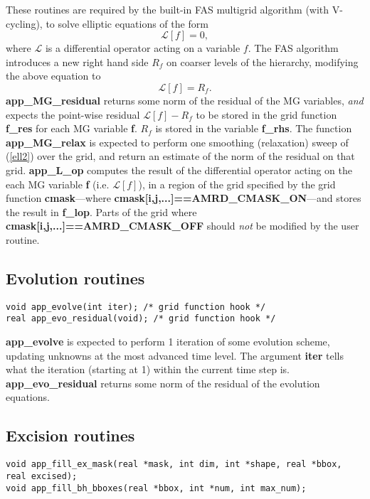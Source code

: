 \documentclass[aps,amssymb,unsortedaddress,nofootinbib]{revtex4}
\begin{document}
These routines are required by the built-in FAS multigrid algorithm (with V-cycling),
to solve elliptic equations of the form 
\begin{equation}
\mathcal{L} [f] = 0,
\end{equation}
where $\mathcal{L}$ is a differential operator acting on a variable $f$. The
FAS algorithm introduces a new right hand side $R_f$ on coarser levels
of the hierarchy, modifying the above equation to
\begin{equation}\label{ell2}
\mathcal{L} [f] = R_f.
\end{equation}
{\bf app\_MG\_residual} returns some norm of the residual of the MG variables,
{\em and} expects the point-wise residual $\mathcal{L} [f]-R_f$ to be stored in the grid function
{\bf f\_res} for each MG variable {\bf f}. $R_f$ is stored in the variable {\bf f\_rhs}. The function
{\bf app\_MG\_relax} is expected to perform one smoothing
(relaxation) sweep of (\ref{ell2}) over the grid, and return an estimate of the norm of the 
residual on that grid. 
{\bf app\_L\_op} computes the result of the differential operator
acting on the each MG variable {\bf f} (i.e. $\mathcal{L} [f]$),
in a region of the grid specified by the grid function {\bf cmask}---where 
{\bf cmask[i,j,...]==AMRD\_CMASK\_ON}---and stores the result in {\bf f\_lop}.
Parts of the grid where {\bf cmask[i,j,...]==AMRD\_CMASK\_OFF} should {\em not}
be modified by the user routine.

\subsection{Evolution routines}

\begin{verbatim}
void app_evolve(int iter); /* grid function hook */
real app_evo_residual(void); /* grid function hook */
\end{verbatim}

{\bf app\_evolve} is expected to perform 1 iteration of some evolution scheme,
updating unknowns at the most advanced time level. The argument {\bf iter} 
tells what the iteration (starting at 1) within the current time step is.
{\bf app\_evo\_residual} returns some norm of the residual of the evolution
equations.

\subsection{Excision routines}\label{sec_ex_fncs}

\begin{verbatim}
void app_fill_ex_mask(real *mask, int dim, int *shape, real *bbox, real excised); 
void app_fill_bh_bboxes(real *bbox, int *num, int max_num);
\end{verbatim}
\end{document}
